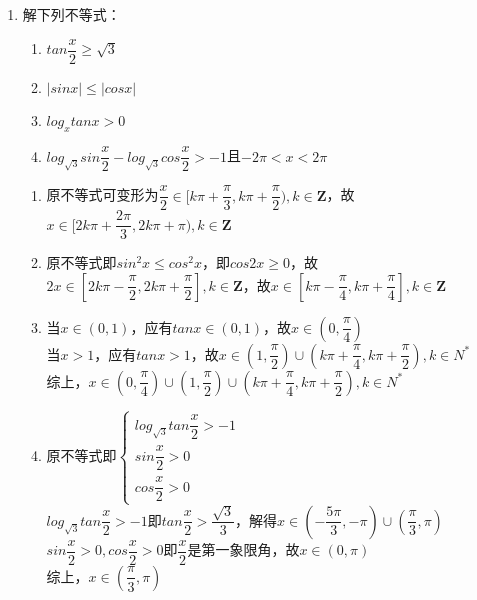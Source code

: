 \begin{enumerate}
\begin{enumerate}
        \item 解下列不等式：
        \begin{enumerate}
            \item $tan\dfrac{x}{2} \geq \sqrt{3}$
            \item $|sinx| \leq |cosx|$
            \item $log_x{tanx} > 0$
            \item $log_{\sqrt{3}}sin\dfrac{x}{2} - log_{\sqrt{3}}cos\dfrac{x}{2} > -1$且$-2\pi < x < 2\pi$
        \end{enumerate}
        \begin{jieda}
            \begin{enumerate}
                \item 原不等式可变形为$\dfrac{x}{2} \in [k\pi + \dfrac{\pi}{3}, k\pi + \dfrac{\pi}{2}), k \in \mathbf{Z}$，故$x \in [2k\pi + \dfrac{2\pi}{3}, 2k\pi + \pi), k \in \mathbf{Z}$
                \item 原不等式即$sin^2x \leq cos^2x$，即$cos2x \geq 0$，故$2x \in [2k\pi - \dfrac{\pi}{2}, 2k\pi + \dfrac{\pi}{2}], k \in \mathbf{Z}$，故$x \in [k\pi - \dfrac{\pi}{4}, k\pi + \dfrac{\pi}{4}], k \in \mathbf{Z}$
                \item 当$x \in (0, 1)$，应有$tanx \in (0, 1)$，故$x \in (0, \dfrac{\pi}{4})$ \\
                当$x > 1$，应有$tanx > 1$，故$x \in (1, \dfrac{\pi}{2}) \cup (k\pi + \dfrac{\pi}{4}, k \pi + \dfrac{\pi}{2}), k \in N^{*}$ \\
                综上，$x \in (0, \dfrac{\pi}{4}) \cup (1, \dfrac{\pi}{2}) \cup (k\pi + \dfrac{\pi}{4}, k \pi + \dfrac{\pi}{2}), k \in N^{*}$
                \item 原不等式即$\left \{ \begin{array}{l}
                     log_{\sqrt{3}}tan\dfrac{x}{2} > -1  \\
                     sin\dfrac{x}{2} > 0 \\
                     cos\dfrac{x}{2} > 0
                \end{array}\right.$ \\
                $log_{\sqrt{3}}tan\dfrac{x}{2} > -1$即$tan\dfrac{x}{2} > \dfrac{\sqrt{3}}{3}$，解得$x \in (-\dfrac{5\pi}{3}, -\pi) \cup (\dfrac{\pi}{3}, \pi)$ \\
                $sin\dfrac{x}{2} > 0, cos\dfrac{x}{2} > 0$即$\dfrac{x}{2}$是第一象限角，故$x \in (0, \pi)$ \\
                综上，$x \in (\dfrac{\pi}{3}, \pi)$
                \end{enumerate}
        \end{jieda}


\end{enumerate}
\end{enumerate}
